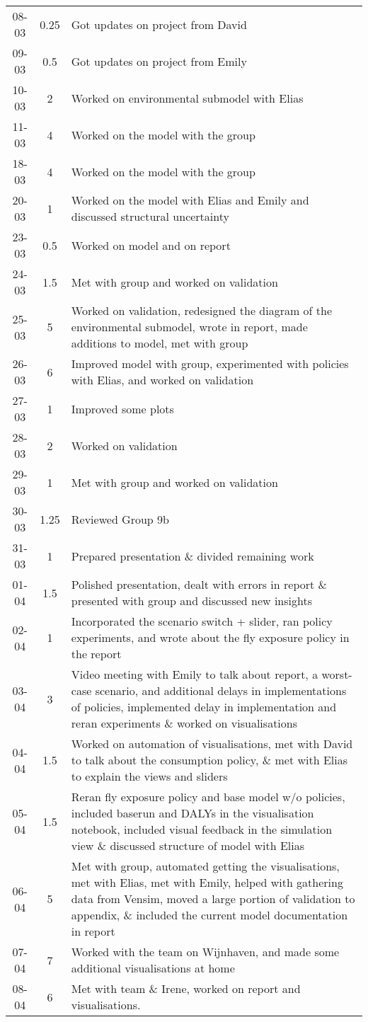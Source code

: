 \begin{longtable}[c]{c|c|m{35em}}
08-03 & 0.25 & Got updates on project from David \\
09-03 & 0.5 & Got updates on project from Emily \\
10-03 & 2 & Worked on environmental submodel with Elias \\
11-03 & 4 & Worked on the model with the group \\
18-03 & 4  & Worked on the model with the group \\
20-03 & 1 & Worked on the model with Elias and Emily and discussed structural uncertainty \\
23-03 & 0.5 & Worked on model and on report \\
24-03 & 1.5 & Met with group and worked on validation \\
25-03 & 5 & Worked on validation, redesigned the diagram of the environmental submodel, wrote in report, made additions to model, met with group \\
26-03 & 6 & Improved model with group, experimented with policies with Elias, and worked on validation \\
27-03 & 1 & Improved some plots \\
28-03 & 2 & Worked on validation \\
29-03 & 1 & Met with group and worked on validation \\
30-03 & 1.25 & Reviewed Group 9b \\
31-03 & 1 & Prepared presentation \& divided remaining work \\
01-04 & 1.5 & Polished presentation, dealt with errors in report \& presented with group and discussed new insights \\
02-04  & 1 & Incorporated the scenario switch + slider, ran policy experiments, and wrote about the fly exposure policy in the report \\
03-04 & 3 & Video meeting with Emily to talk about report, a worst-case scenario, and additional delays in implementations of policies, implemented delay in implementation and reran experiments \& worked on visualisations \\
04-04 & 1.5 & Worked on automation of visualisations, met with David to talk about the consumption policy, \&  met with Elias to explain the views and sliders \\
05-04 & 1.5 & Reran fly exposure policy and base model w/o policies, included baserun and DALYs in the visualisation notebook, included visual feedback in the simulation view \& discussed structure of model with Elias \\
06-04 & 5 & Met with group, automated getting the visualisations, met with Elias, met with Emily, helped with gathering data from Vensim, moved a large portion of validation to appendix, \& included the current model documentation in report \\
07-04 & 7 & Worked with the team on Wijnhaven, and made some additional visualisations at home \\
08-04 & 6 & Met with team \& Irene, worked on report and visualisations.
\end{longtable}

